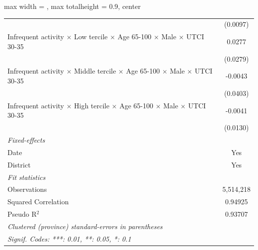 \begin{table}[htbp]
\begin{adjustbox}{max width = \textwidth, max totalheight = 0.9\textheight, center}
\begin{tabular}{lc}
                                                                                                                 & (0.0097)\\   
         Infrequent activity $\times$ Low tercile $\times$ Age 65-100 $\times$ Male $\times$ UTCI 30-35          & 0.0277\\   
                                                                                                                 & (0.0279)\\   
         Infrequent activity $\times$ Middle tercile $\times$ Age 65-100 $\times$ Male $\times$ UTCI 30-35       & -0.0043\\   
                                                                                                                 & (0.0403)\\   
         Infrequent activity $\times$ High tercile $\times$ Age 65-100 $\times$ Male $\times$ UTCI 30-35         & -0.0041\\   
                                                                                                                 & (0.0130)\\   
         \midrule
         \emph{Fixed-effects}\\
         Date                                                                                                    & Yes\\  
         District                                                                                                & Yes\\  
         \midrule
         \emph{Fit statistics}\\
         Observations                                                                                            & 5,514,218\\  
         Squared Correlation                                                                                     & 0.94925\\  
         Pseudo R$^2$                                                                                            & 0.93707\\  
         \midrule \midrule
         \multicolumn{2}{l}{\emph{Clustered (province) standard-errors in parentheses}}\\
         \multicolumn{2}{l}{\emph{Signif. Codes: ***: 0.01, **: 0.05, *: 0.1}}\\
      \end{tabular}
   \end{adjustbox}
\end{table}


